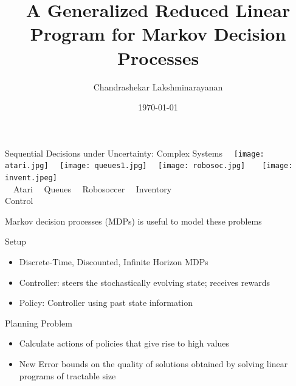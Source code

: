 \documentclass[10pt]{beamer}
\title{A Generalized Reduced Linear Program for Markov Decision Processes}
\date{\today}
\author{Chandrashekar Lakshminarayanan}
\institute{Reinforcement Learning \& Artificial Intelligence Group,\\University of Alberta}
\begin{document}
\maketitle



\begin{frame}[fragile]{Sequential Decisions under Uncertainty: Complex Systems}
$\mbox{ }$
\texttt{[image: atari.jpg]}
$\mbox{ }$
\texttt{[image: queues1.jpg]}
$\mbox{ }$
\texttt{[image: robosoc.jpg]}
$\mbox{ }$$\mbox{ }$
\texttt{[image: invent.jpeg]}
$\mbox{ }$\\
$\mbox{ }$
\quad Atari\quad\quad\quad\quad
$\mbox{ }$
Queues\quad\quad\quad\quad
$\mbox{ }$
Robosoccer\quad\quad
$\mbox{ }$
Inventory
$\mbox{ }$\\
\quad\quad\quad\quad\quad\quad\quad
\quad\quad\quad\quad\quad\quad\quad
\quad\quad\quad\quad\quad\quad\quad
\quad\quad\quad
Control
\begin{block}{}
Markov decision processes (MDPs) is useful to model these problems
\end{block}

\end{frame}


\begin{frame}[fragile]{Setup}
\begin{itemize}
\item Discrete-Time, Discounted, Infinite Horizon MDPs
\item Controller: steers the stochastically evolving state; receives rewards
\item Policy: Controller using past state information
\end{itemize}
\begin{block}{Planning Problem}
\begin{itemize}
\item Calculate actions of policies that give rise to high values
\item New Error bounds on the quality of solutions obtained by solving linear programs of tractable size
\end{itemize}
\end{block}

\end{frame}
\end{document}
